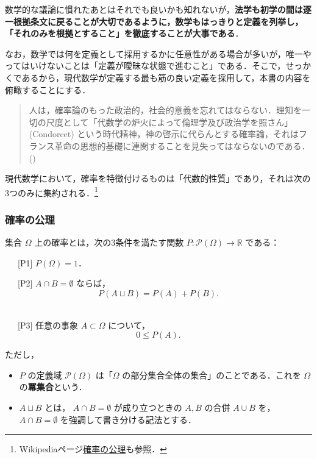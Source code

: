 \documentclass[
  letterpaper,
  DIV=11,
  numbers=noendperiod]{scrartcl}
\providecommand{\tightlist}{%
  \setlength{\itemsep}{0pt}\setlength{\parskip}{0pt}}\usepackage{longtable,booktabs,array}
\begin{document}
数学的な議論に慣れたあとはそれでも良いかも知れないが，\textbf{法学も初学の間は逐一根拠条文に戻ることが大切であるように，数学もはっきりと定義を列挙し，「それのみを根拠とすること」を徹底することが大事である}．

なお，数学では何を定義として採用するかに任意性がある場合が多いが，唯一やってはいけないことは「定義が曖昧な状態で進むこと」である．そこで，せっかくであるから，現代数学が定義する最も筋の良い定義を採用して，本書の内容を俯瞰することにする．

\begin{quote}
人は，確率論のもった政治的，社会的意義を忘れてはならない．理知を一切の尺度として「代数学の炉火によって倫理学及び政治学を照さん」(Condorcet)
という時代精神，神の啓示に代らんとする確率論，それはフランス革命の思想的基礎に連関することを見失ってはならないのである．()
\end{quote}

現代数学において，確率を特徴付けるものは「代数的性質」であり，それは次の3つのみに集約される．\footnote{Wikipediaページ\href{https://ja.wikipedia.org/wiki/\%E7\%A2\%BA\%E7\%8E\%87\%E3\%81\%AE\%E5\%85\%AC\%E7\%90\%86}{確率の公理}も参照．}

\subsubsection{確率の公理}\label{sec-axiom}

\begin{tcolorbox}[enhanced jigsaw, toprule=.15mm, leftrule=.75mm, titlerule=0mm, bottomtitle=1mm, title={定義（確率） {[}@Kolmogorov1931{]}}, arc=.35mm, toptitle=1mm, colbacktitle=quarto-callout-tip-color!10!white, coltitle=black, rightrule=.15mm, colback=white, opacityback=0, colframe=quarto-callout-tip-color-frame, opacitybacktitle=0.6, left=2mm, breakable, bottomrule=.15mm]

集合 \(\Omega\) 上の確率とは，次の3条件を満たす関数
\(P:\mathcal{P}(\Omega)\to\mathbb{R}\) である：\footnotemark{}\\
\strut ~~~{[}P1{]} \(P(\Omega)=1\)．\\
\strut ~~~{[}P2{]} \(A\cap B=\emptyset\) ならば，
\[P(A\sqcup B)=P(A)+P(B).\]\\
\strut ~~~{[}P3{]} 任意の事象 \(A\subset\Omega\) について，
\[0\le P(A).\]\footnotemark{}

ただし，

\begin{itemize}
\tightlist
\item
  \(P\) の定義域 \(\mathcal{P}(\Omega)\) は「\(\Omega\)
  の部分集合全体の集合」のことである．これを \(\Omega\)
  の\textbf{冪集合}という．
\item
  \(A\sqcup B\) とは， \(A\cap B=\emptyset\) が成り立つときの \(A,B\)
  の合併 \(A\cup B\) を，\(A\cap B=\emptyset\)
  を強調して書き分ける記法とする．
\end{itemize}

\end{tcolorbox}
\end{document}
